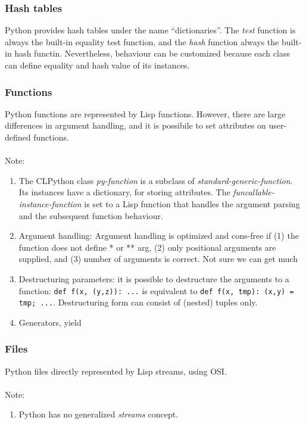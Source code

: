 \documentclass{article}
\begin{document}
\subsubsection{Hash tables}
Python provides hash tables under the name ``dictionaries''. The {\em
test} function is always the built-in equality test function, and the
{\em hash} function always the built-in hash functin. Nevertheless,
behaviour can be customized because each class can define equality and
hash value of its instances.


\subsubsection{Functions} \label{sec:functions}
Python functions are represented by Lisp functions. However, there are
large differences in argument handling, and it is possibile to set
attributes on user-defined functions.
\\ \\
Note:
\begin{enumerate}
 \item{} The CLPython class {\em py-function} is a subclass of {\em
     standard-generic-function}. Its instances have a dictionary, for
     storing attributes. The {\em funcallable-instance-function} is
     set to a Lisp function that handles the argument parsing and the
     subsequent function behaviour.

 \item{} Argument handling:
      Argument handling is optimized and cons-free if (1) the function
      does not define * or ** arg, (2) only positional arguments are
      supplied, and (3) number of arguments is correct. Not sure we
      can get much

 \item{} Destructuring parameters: it is possible to destructure the
      arguments to a function: {\tt def f(x, (y,z)): ...} is
      equivalent to {\tt def f(x, tmp): (x,y) = tmp;
      ...}. Destructuring form can consist of (nested) tuples only.

 \item{} Generators, yield

\end{enumerate}

\subsubsection{Files}
Python files directly represented by Lisp streams, using OSI.
\\ \\
Note:
\begin{enumerate}
 \item{} Python has no generalized {\em streams} concept.
\end{enumerate}
\end{document}
